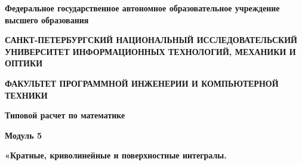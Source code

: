 \documentclass[12pt]{article}
\begin{document}
	\pagestyle{empty}
	
	\begin{center}
		\normalsize
		\textbf{Федеральное государственное автономное образовательное учреждение высшего образования}

		\small
		\medskip 
		\textbf{САНКТ-ПЕТЕРБУРГСКИЙ НАЦИОНАЛЬНЫЙ ИССЛЕДОВАТЕЛЬСКИЙ  УНИВЕРСИТЕТ ИНФОРМАЦИОННЫХ ТЕХНОЛОГИЙ, МЕХАНИКИ И ОПТИКИ}

		\medskip 
		\textbf{ФАКУЛЬТЕТ ПРОГРАММНОЙ ИНЖЕНЕРИИ И КОМПЬЮТЕРНОЙ ТЕХНИКИ}	
	\bigskip\bigskip\bigskip\bigskip\bigskip\bigskip\bigskip\bigskip\bigskip\bigskip\bigskip\bigskip	
		\par\medskip\par\smallskip\par\smallskip
		\Large 
		\textbf{Типовой расчет по математике} 

		\textbf{Модуль 5}

		\large
		\par\bigskip
		\textbf{«Кратные, криволинейные и поверхностные интегралы.}
		

\end{center}
\end{document}
